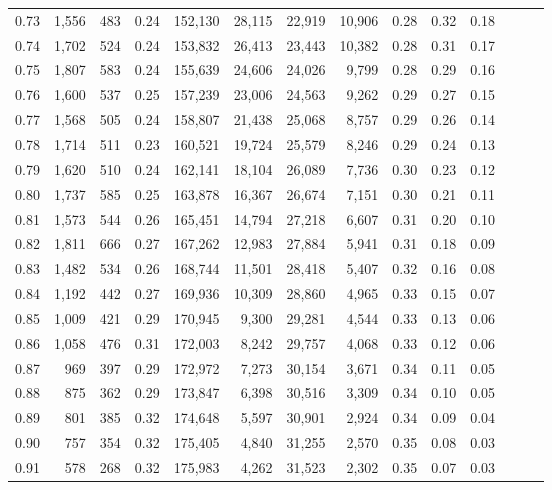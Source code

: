 \begin{tabular}{rrrrrrrrrrrrrr}
0.73 &  1,556 &  483 &  0.24 &  152,130 &   28,115 &  22,919 &  10,906 &  0.28 &  0.32 &      0.18 \\
0.74 &  1,702 &  524 &  0.24 &  153,832 &   26,413 &  23,443 &  10,382 &  0.28 &  0.31 &      0.17 \\
0.75 &  1,807 &  583 &  0.24 &  155,639 &   24,606 &  24,026 &   9,799 &  0.28 &  0.29 &      0.16 \\
0.76 &  1,600 &  537 &  0.25 &  157,239 &   23,006 &  24,563 &   9,262 &  0.29 &  0.27 &      0.15 \\
0.77 &  1,568 &  505 &  0.24 &  158,807 &   21,438 &  25,068 &   8,757 &  0.29 &  0.26 &      0.14 \\
0.78 &  1,714 &  511 &  0.23 &  160,521 &   19,724 &  25,579 &   8,246 &  0.29 &  0.24 &      0.13 \\
0.79 &  1,620 &  510 &  0.24 &  162,141 &   18,104 &  26,089 &   7,736 &  0.30 &  0.23 &      0.12 \\
0.80 &  1,737 &  585 &  0.25 &  163,878 &   16,367 &  26,674 &   7,151 &  0.30 &  0.21 &      0.11 \\
0.81 &  1,573 &  544 &  0.26 &  165,451 &   14,794 &  27,218 &   6,607 &  0.31 &  0.20 &      0.10 \\
0.82 &  1,811 &  666 &  0.27 &  167,262 &   12,983 &  27,884 &   5,941 &  0.31 &  0.18 &      0.09 \\
0.83 &  1,482 &  534 &  0.26 &  168,744 &   11,501 &  28,418 &   5,407 &  0.32 &  0.16 &      0.08 \\
0.84 &  1,192 &  442 &  0.27 &  169,936 &   10,309 &  28,860 &   4,965 &  0.33 &  0.15 &      0.07 \\
0.85 &  1,009 &  421 &  0.29 &  170,945 &    9,300 &  29,281 &   4,544 &  0.33 &  0.13 &      0.06 \\
0.86 &  1,058 &  476 &  0.31 &  172,003 &    8,242 &  29,757 &   4,068 &  0.33 &  0.12 &      0.06 \\
0.87 &    969 &  397 &  0.29 &  172,972 &    7,273 &  30,154 &   3,671 &  0.34 &  0.11 &      0.05 \\
0.88 &    875 &  362 &  0.29 &  173,847 &    6,398 &  30,516 &   3,309 &  0.34 &  0.10 &      0.05 \\
0.89 &    801 &  385 &  0.32 &  174,648 &    5,597 &  30,901 &   2,924 &  0.34 &  0.09 &      0.04 \\
0.90 &    757 &  354 &  0.32 &  175,405 &    4,840 &  31,255 &   2,570 &  0.35 &  0.08 &      0.03 \\
0.91 &    578 &  268 &  0.32 &  175,983 &    4,262 &  31,523 &   2,302 &  0.35 &  0.07 &      0.03 \\

\end{tabular}
